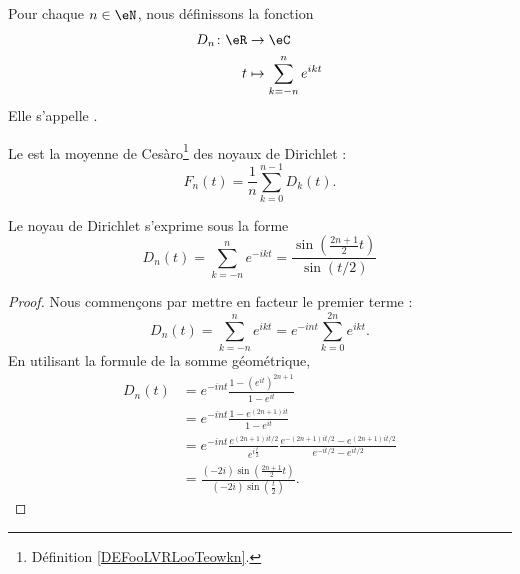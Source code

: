 \begin{definition}      \label{DEFooYVJCooCGEYaG}
	Pour chaque \( n\in \eN\), nous définissons la fonction
	\begin{equation}
		\begin{aligned}
			D_n\colon \eR & \to \eC                        \\
			t             & \mapsto \sum_{k=-n}^n  e^{ikt}
		\end{aligned}
	\end{equation}
	Elle s'appelle .
\end{definition}

\begin{definition}
	Le  est la moyenne de Cesàro\footnote{Définition \ref{DEFooLVRLooTeowkn}.} des noyaux de Dirichlet :
	\begin{equation}
		F_n(t)=\frac{1}{ n }\sum_{k=0}^{n-1}D_k(t).
	\end{equation}
\end{definition}

\begin{lemma}   \label{LemHPoIkwu}
	Le noyau de Dirichlet s'exprime sous la forme
	\begin{equation}
		D_n(t)=\sum_{k=-n}^n e^{-ikt}=\frac{ \sin\left( \frac{ 2n+1 }{ 2 }t \right) }{ \sin(t/2) }
	\end{equation}
\end{lemma}

\begin{proof}
	Nous commençons par mettre en facteur le premier terme :
	\begin{equation}
		D_n(t)=\sum_{k=-n}^n e^{ikt}= e^{-int}\sum_{k=0}^{2n} e^{ikt}.
	\end{equation}
	En utilisant la formule de la somme géométrique,
	\begin{subequations}
		\begin{align}
			D_n(t) & = e^{-int}\frac{ 1-( e^{it})^{2n+1} }{ 1- e^{it} }                                                                       \\
			       & = e^{-int}\frac{ 1- e^{(2n+1)it} }{ 1- e^{it} }                                                                          \\
			       & = e^{-int}\frac{ e^{(2n+1)it/2} }{ e^{i\frac{ t }{ 2 }} }\frac{ e^{-(2n+1)it/2}- e^{(2n+1)it/2} }{ e^{-it/2}- e^{it/2} } \\
			       & = \frac{ (-2i)\sin\left( \frac{ 2n+1 }{ 2 }t \right) }{ (-2i)\sin\left( \frac{ t }{2} \right) }.
		\end{align}
	\end{subequations}
\end{proof}

